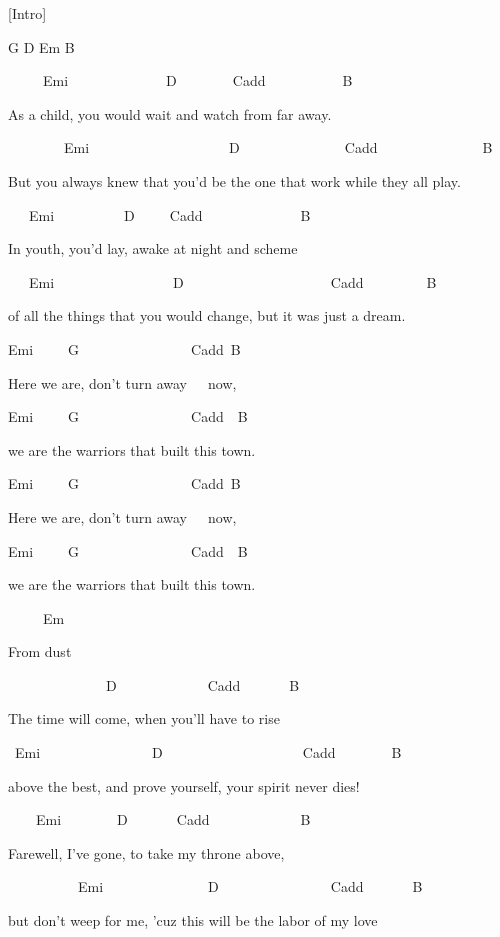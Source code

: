 
[Intro]

G D Em B\7

\bigskip

~~~~~Emi~~~~~~~~~~~~~~D~~~~~~~~Cadd\9~~~~~~~~~~~B\7
     
As a child, you would wait and watch from far away.

~~~~~~~~Emi~~~~~~~~~~~~~~~~~~~~D~~~~~~~~~~~~~~~Cadd\9~~~~~~~~~~~~~~~B\7

But you always knew that you'd be the one that work while they all play.

~~~Emi~~~~~~~~~~D~~~~~Cadd\9~~~~~~~~~~~~~~B\7     

In youth, you'd lay, awake at night and scheme

~~~Emi~~~~~~~~~~~~~~~~~D~~~~~~~~~~~~~~~~~~~~~Cadd\9~~~~~~~~~B\7

of all the things that you would change, but it was just a dream.

\bigskip

\begin{chorustext}
Emi~~~~~G~~~~~~~~~~~~~~~~Cadd\9~B\7

Here we are, don't turn away~~~now,

Emi~~~~~G~~~~~~~~~~~~~~~~Cadd\9~~B\7

we are the warriors that built this town.

Emi~~~~~G~~~~~~~~~~~~~~~~Cadd\9~B\7

Here we are, don't turn away~~~now,

Emi~~~~~G~~~~~~~~~~~~~~~~Cadd\9~~B\7

we are the warriors that built this town.

~~~~~Em

From dust
\end{chorustext}

\bigskip

~~~~~~~~~~~~~~D~~~~~~~~~~~~~Cadd\9~~~~~~~B\7

The time will come, when you'll have to rise

~Emi~~~~~~~~~~~~~~~~D~~~~~~~~~~~~~~~~~~~~Cadd\9~~~~~~~~B\7

above the best, and prove yourself, your spirit never dies!

~~~~Emi~~~~~~~~D~~~~~~~Cadd\9~~~~~~~~~~~~~B\7~~

Farewell, I've gone, to take my throne above, 

~~~~~~~~~~Emi~~~~~~~~~~~~~~~D~~~~~~~~~~~~~~~~Cadd\9~~~~~~~B\7

but don't weep for me, 'cuz this will be the labor of my love

\bigskip

\chorus